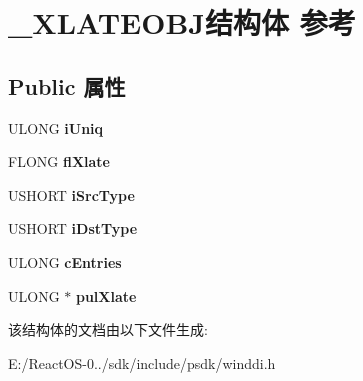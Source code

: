 \hypertarget{struct___x_l_a_t_e_o_b_j}{}\section{\+\_\+\+X\+L\+A\+T\+E\+O\+B\+J结构体 参考}
\label{struct___x_l_a_t_e_o_b_j}
\subsection*{Public 属性}
\begin{DoxyCompactItemize}
\item 
\mbox{\label{struct___x_l_a_t_e_o_b_j_a3800a9251f8b7a951b32ed604ace3c33}} 
U\+L\+O\+NG {\bfseries i\+Uniq}
\item 
\mbox{\label{struct___x_l_a_t_e_o_b_j_a73708c33acccdeaa30f97489772e3760}} 
F\+L\+O\+NG {\bfseries fl\+Xlate}
\item 
\mbox{\label{struct___x_l_a_t_e_o_b_j_ab477c1edbfffa04beb3dad5b3dda045c}} 
U\+S\+H\+O\+RT {\bfseries i\+Src\+Type}
\item 
\mbox{\label{struct___x_l_a_t_e_o_b_j_aab5a232c5501bf469b0b455f478ab8bd}} 
U\+S\+H\+O\+RT {\bfseries i\+Dst\+Type}
\item 
\mbox{\label{struct___x_l_a_t_e_o_b_j_a884632258680d353a8b486d5ccb048fa}} 
U\+L\+O\+NG {\bfseries c\+Entries}
\item 
\mbox{\label{struct___x_l_a_t_e_o_b_j_a26128e08273cef3538bfc738e554a4ba}} 
U\+L\+O\+NG $\ast$ {\bfseries pul\+Xlate}
\end{DoxyCompactItemize}


该结构体的文档由以下文件生成\+:\begin{DoxyCompactItemize}
\item 
E\+:/\+React\+O\+S-\/0../sdk/include/psdk/winddi.\+h\end{DoxyCompactItemize}
